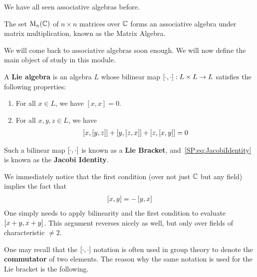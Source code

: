 We have all seen associative algebras before.

\begin{boxexample}\label{Ch1:Eg:MatrixAlgebra}
    The set $\operatorname{M}_{n}\!\left( \mathbb{C} \right)$ of $n \times n$ matrices over $\mathbb{C}$ forms an associative algebra under matrix multiplication, known as the Matrix Algebra.
\end{boxexample}

We will come back to associative algebras soon enough. We will now define the main object of study in this module.

\begin{boxdefinition}
    A \textbf{Lie algebra} is an algebra $L$ whose bilinear map $\left[ \cdot, \cdot \right]: L \times L \to L$ satisfies the following properties:
    \begin{enumerate}
        \item For all $x \in L$, we have $[x, x] = 0$.
        \item For all $x, y, z \in L$, we have
        \begin{align}
            \left[ x, \left[ y, z \right] \right] + \left[ y, \left[ z, x \right] \right] + \left[ z, \left[ x, y \right] \right] = 0
            \label{SP:eq:JacobiIdentity}
        \end{align}
    \end{enumerate}
    Such a bilinear map $\left[ \cdot, \cdot \right]$ is known as a \textbf{Lie Bracket}, and~\eqref{SP:eq:JacobiIdentity} is known as the \textbf{Jacobi Identity}.
\end{boxdefinition}

\begin{remark}
    We immediately notice that the first condition (over not just $\mathbb{C}$ but any field) implies the fact that
    \begin{align}
        \left[ x, y \right] = - \left[ y, x \right]
        \label{SP:Eq:LieBracAntisymm}
    \end{align}
    One simply needs to apply bilinearity and the first condition to evaluate $\left[ x + y, x + y \right]$. This argument reverses nicely as well, but only over fields of characteristic $\neq 2$.
\end{remark} 

One may recall that the $\left[ \cdot, \cdot \right]$ notation is often used in group theory to denote the \textbf{commutator} of two elements. The reason why the same notation is used for the Lie bracket is the following.

